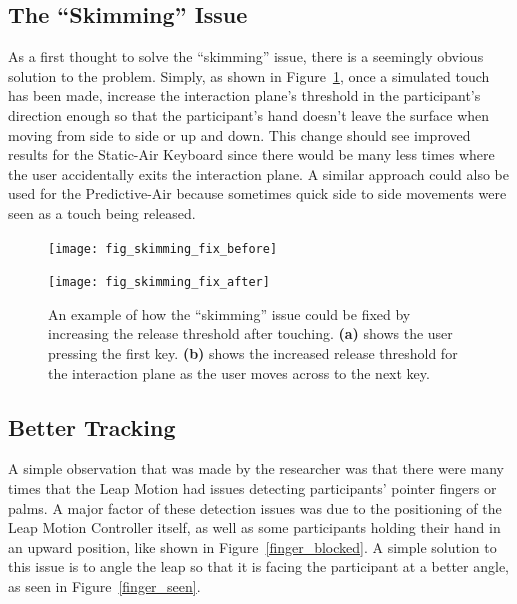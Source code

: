\subsection{The ``Skimming'' Issue}
As a first thought to solve the ``skimming'' issue, there is a seemingly obvious solution to the problem. Simply, as shown in Figure~\ref{skimming_problem_fix}, once a simulated touch has been made, increase the interaction plane's threshold in the participant's direction enough so that the participant's hand doesn't leave the surface when moving from side to side or up and down. This change should see improved results for the Static-Air Keyboard since there would be many less times where the user accidentally exits the interaction plane. A similar approach could also be used for the Predictive-Air because sometimes quick side to side movements were seen as a touch being released.

\begin{figure}[h]
	\centering
	\begin{minipage}[t]{2.5in}
		\texttt{[image: fig\_skimming\_fix\_before]}
	\end{minipage}
	\begin{minipage}[t]{2.5in}
		\texttt{[image: fig\_skimming\_fix\_after]}
	\end{minipage}
	\caption[``Skimming Solution'']{An example of how the ``skimming'' issue could be fixed by increasing the release threshold after touching. \textbf{(a)} shows the user pressing the first key. \textbf{(b)} shows the increased release threshold for the interaction plane as the user moves across to the next key.}
	\label{skimming_problem_fix}
\end{figure}

\subsection{Better Tracking}
A simple observation that was made by the researcher was that there were many times that the Leap Motion had issues detecting participants' pointer fingers or palms. A major factor of these detection issues was due to the positioning of the Leap Motion Controller itself, as well as some participants holding their hand in an upward position, like shown in Figure~\ref{finger_blocked}. A simple solution to this issue is to angle the leap so that it is facing the participant at a better angle, as seen in Figure~\ref{finger_seen}.

